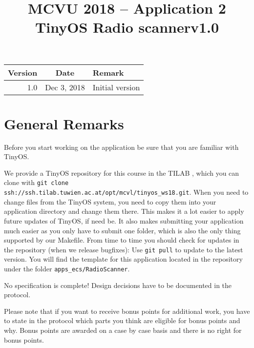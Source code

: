 \documentclass[a4paper,10pt]{article}
\title{MCVU 2018 -- Application 2\\TinyOS Radio scanner{\small{v1.0}}}
\author{}
\date{}
\begin{document}
\maketitle


\begin{center}

\begin{tabular}{|r|c|l|}
\hline
Version & Date & Remark \\
\hline
\hline
1.0 & Dec 3, 2018 & Initial version \\

\hline

\end{tabular}
\end{center}

\tableofcontents

\section{General Remarks}
Before you start working on the application be sure that you are familiar with
	TinyOS.

We provide a TinyOS repository for this course in the TILAB , which you can
	clone with \texttt{git clone
	ssh://ssh.tilab.tuwien.ac.at/opt/mcvl/tinyos\_ws18.git}.
When you need to change files from the TinyOS system, you need to copy them
	into your application directory and change them there.
This makes it a lot easier to apply future updates of TinyOS, if need be.
It also makes submitting your application much easier as you only have to
	submit one folder, which is also the only thing supported by our Makefile.
From time to time you should check for updates in the repository (when we
	release bugfixes):
Use \texttt{git~pull} to update to the latest version.
You will find the template for this application located in the repository
	under the folder \texttt{apps\_ecs/RadioScanner}.

\medskip

No specification is complete!
Design decisions have to be documented in the protocol.

\medskip

Please note that if you want to receive bonus points for additional
	work, you have to state in the protocol which parts you think are eligible
	for bonus points and why.
Bonus points are awarded on a case by case basis and there is no right
	for bonus points.
\end{document}
